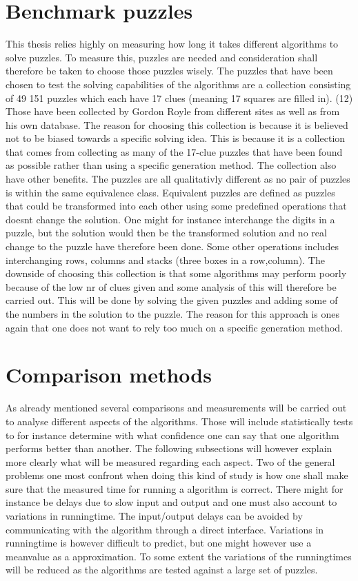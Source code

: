 \documentclass[a4paper,11pt]{kth-mag}
\begin{document}
\section{Benchmark puzzles}
This thesis relies highly on measuring how long it takes different algorithms to solve puzzles. To measure this, puzzles are needed and consideration shall therefore be taken to choose those puzzles wisely. The puzzles that have been chosen to test the solving capabilities of the algorithms are a collection consisting of 49 151 puzzles which each have 17 clues (meaning 17 squares are filled in). (12) Those have been collected by Gordon Royle from different sites as well as from his own database. The reason for choosing this collection is because it is believed not to be biased towards a specific solving idea. This is because it is a collection that comes from collecting as many of the 17-clue puzzles that have been found as possible rather than using a specific generation method. The collection also have other benefits. The puzzles are all qualitativly different as no pair of puzzles is within the same equivalence class. Equivalent puzzles are defined as puzzles that could be transformed into each other using some predefined operations that doesnt change the solution. One might for instance interchange the digits in a puzzle, but the solution would then be the transformed solution and no real change to the puzzle have therefore been done. Some other operations includes interchanging rows, columns and stacks (three boxes in a row,column). The downside of choosing this collection is that some algorithms may perform poorly because of the low nr of clues given and some analysis of this will therefore be carried out. This will be done by solving the given puzzles and adding some of the numbers in the solution to the puzzle. The reason for this approach is ones again that one does not want to rely too much on a specific generation method.

\section{Comparison methods}
As already mentioned several comparisons and measurements will be carried out to 
analyse different aspects of the algorithms. Those will include statistically tests 
to for instance determine with what confidence one can say that one algorithm performs 
better than another. 
The following subsections will however explain more clearly what will be measured 
regarding each aspect. 
Two of the general problems one most confront when doing this kind of study is how one 
shall make sure that the measured time for  running a algorithm is correct. 
There might for instance be delays due to slow input and output and one must also account 
to variations in runningtime. 
The input/output delays can be avoided by communicating with the algorithm through a 
direct interface. 
Variations in runningtime is however difficult to predict, but one might however use a 
meanvalue as a approximation. 
To some extent the variations of the runningtimes will be reduced as the algorithms are tested against a large set of puzzles.  
\end{document}
